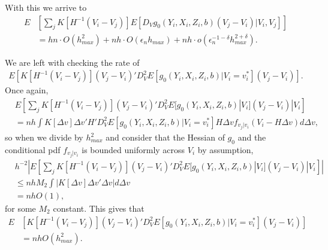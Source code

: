 \documentclass{article}
\theoremstyle{definition}
\theoremstyle{remark}
\begin{document}
With this we arrive to
\begin{align}
E&\left[\sum_j K[H^{-1}(V_i-V_j)] E[D_V g_0(Y_i, X_i, Z_i, b)(V_j-V_i)|V_i,V_j] \right] \\
&=hn \cdot O(h^2_{max}) + nh \cdot O(\epsilon_n h_{max}) + nh \cdot o(\epsilon_n^{-1-\delta}h_{max}^{2+\delta}). \nonumber
\end{align}

We are left with checking the rate of
\begin{align}
E\left[K[H^{-1}(V_i-V_j)](V_j-V_i)' D^2_{V}E[g_0(Y_i, X_i, Z_i, b)|V_i=v_i^
*] (V_j-V_i)\right].
\end{align}
Once again,
\begin{align}
&E\left[\sum_j K[H^{-1}(V_i-V_j)](V_j-V_i)' D^2_{V}E[g_0(Y_i, X_i, Z_i, b)|V_i] (V_j-V_i)|V_i\right] \\
&=nh \int K[\Delta v] \Delta v'H'  D^2_{V}E[g_0(Y_i, X_i, Z_i, b)|V_i= v_i^*] H \Delta v f_{v_j|v_i}(V_i-H\Delta v) d\Delta v, \nonumber
\end{align}
so when we divide by $h^2_{max}$ and consider that the Hessian of $g_0$ and the conditional pdf $f_{v_j|v_i}$ is bounded uniformly across $V_i$ by assumption,
\begin{align}
&h^{-2}\left|E\left[\sum_j K[H^{-1}(V_i-V_j)](V_j-V_i)' D^2_{V}E[g_0(Y_i, X_i, Z_i, b)|V_i] (V_j-V_i)|V_i\right]\right| \nonumber \\
&\leq nh M_2\int \left|K[\Delta v] \Delta v' \Delta v\right| d\Delta v \nonumber \\
& = nh O(1),
\end{align}
for some $M_2$ constant. This gives that
\begin{align}
E&\left[K[H^{-1}(V_i-V_j)](V_j-V_i)' D^2_{V}E[g_0(Y_i, X_i, Z_i, b)|V_i=v_i^
*] (V_j-V_i)\right] \\
&= nh O(h^2_{max}). \nonumber
\end{align}
\end{document}
